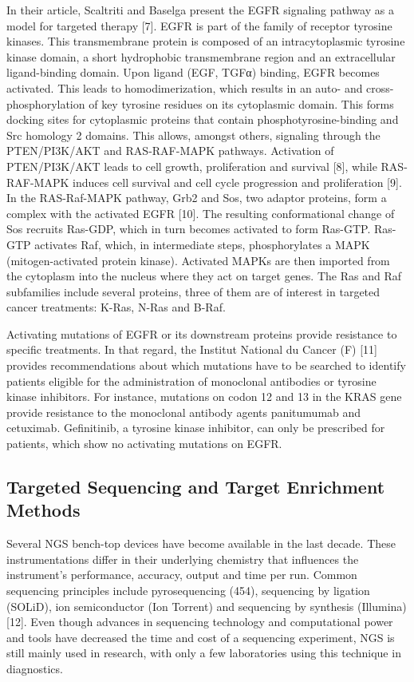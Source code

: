 In their article, Scaltriti and Baselga present the EGFR signaling pathway as a
model for targeted therapy [7]. EGFR is part of the family of receptor tyrosine
kinases. This transmembrane protein is composed of an intracytoplasmic tyrosine
kinase domain, a short hydrophobic transmembrane region and an extracellular
ligand-binding domain. Upon ligand (EGF, TGFα) binding, EGFR becomes activated.
This leads to homodimerization, which results in an auto- and
cross-phosphorylation of key tyrosine residues on its cytoplasmic domain. This
forms docking sites for cytoplasmic proteins that contain
phosphotyrosine-binding and Src homology 2 domains. This allows, amongst others,
signaling through the PTEN/PI3K/AKT and RAS-RAF-MAPK pathways. Activation of
PTEN/PI3K/AKT leads to cell growth, proliferation and survival [8], while
RAS-RAF-MAPK induces cell survival and cell cycle progression and proliferation
[9]. In the RAS-Raf-MAPK pathway, Grb2 and Sos, two adaptor proteins, form a
complex with the activated EGFR [10]. The resulting conformational change of Sos
recruits Ras-GDP, which in turn becomes activated to form Ras-GTP. Ras-GTP
activates Raf, which, in intermediate steps, phosphorylates a MAPK
(mitogen-activated protein kinase). Activated MAPKs are then imported from the
cytoplasm into the nucleus where they act on target genes. The Ras and Raf
subfamilies include several proteins, three of them are of interest in targeted
cancer treatments: K-Ras, N-Ras and B-Raf.

Activating mutations of EGFR or its downstream proteins provide resistance to
specific treatments. In that regard, the Institut National du Cancer (F) [11]
provides recommendations about which mutations have to be searched to identify
patients eligible for the administration of monoclonal antibodies or tyrosine
kinase inhibitors. For instance, mutations on codon 12 and 13 in the KRAS gene
provide resistance to the monoclonal antibody agents panitumumab and cetuximab.
Gefinitinib, a tyrosine kinase inhibitor, can only be prescribed for patients,
which show no activating mutations on EGFR.

\subsection{Targeted Sequencing and Target Enrichment Methods}
Several NGS bench-top devices have become available in the last decade. These
instrumentations differ in their underlying chemistry that influences the
instrument’s performance, accuracy, output and time per run. Common sequencing
principles include pyrosequencing (454), sequencing by ligation (SOLiD), ion
semiconductor (Ion Torrent) and sequencing by synthesis (Illumina) [12]. Even
though advances in sequencing technology and computational power and tools have
decreased the time and cost of a sequencing experiment, NGS is still mainly used
in research, with only a few laboratories using this technique in diagnostics.

